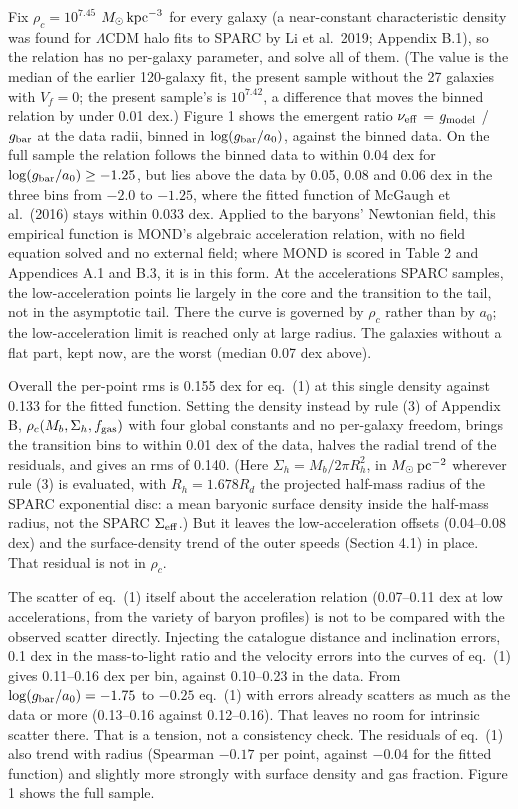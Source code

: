 \documentclass[
  10pt,
]{article}
\begin{document}
Fix $\rho_c=10^{7.45}$ $M_\odot\,{\rm kpc}^{-3}$ for every galaxy (a near-constant characteristic density was found for $\Lambda$CDM halo fits to SPARC by Li et al.~2019; Appendix B.1), so the relation has no per-galaxy parameter, and solve all of them. (The value is the median of the earlier 120-galaxy fit, the present sample without the 27 galaxies with $V_f=0$; the present sample's is $10^{7.42}$, a difference that moves the binned relation by under 0.01 dex.) Figure 1 shows the emergent ratio $\nu_{\rm eff}$ = $g_{\rm model}$ / $g_{\rm bar}$ at the data radii, binned in $\log(g_{\rm bar}/a_0)$, against the binned data. On the full sample the relation follows the binned data to within 0.04 dex for $\log(g_{\rm bar}/a_0)\ge-1.25$, but lies above the data by 0.05, 0.08 and 0.06 dex in the three bins from $-2.0$ to $-1.25$, where the fitted function of McGaugh et al.~(2016) stays within 0.033 dex. Applied to the baryons' Newtonian field, this empirical function is MOND's algebraic acceleration relation, with no field equation solved and no external field; where MOND is scored in Table 2 and Appendices A.1 and B.3, it is in this form. At the accelerations SPARC samples, the low-acceleration points lie largely in the core and the transition to the tail, not in the asymptotic tail. There the curve is governed by $\rho_c$ rather than by $a_0$; the low-acceleration limit is reached only at large radius. The galaxies without a flat part, kept now, are the worst (median 0.07 dex above).

Overall the per-point rms is 0.155 dex for eq.~(1) at this single density against 0.133 for the fitted function. Setting the density instead by rule (3) of Appendix B, $\rho_c(M_b,\Sigma_h,f_{\rm gas})$ with four global constants and no per-galaxy freedom, brings the transition bins to within 0.01 dex of the data, halves the radial trend of the residuals, and gives an rms of 0.140. (Here $\Sigma_h=M_b/2\pi R_h^2$, in $M_\odot\,{\rm pc}^{-2}$ wherever rule (3) is evaluated, with $R_h=1.678R_d$ the projected half-mass radius of the SPARC exponential disc: a mean baryonic surface density inside the half-mass radius, not the SPARC $\Sigma_{\rm eff}$.) But it leaves the low-acceleration offsets (0.04--0.08 dex) and the surface-density trend of the outer speeds (Section 4.1) in place. That residual is not in $\rho_c$.

The scatter of eq.~(1) itself about the acceleration relation (0.07--0.11 dex at low accelerations, from the variety of baryon profiles) is not to be compared with the observed scatter directly. Injecting the catalogue distance and inclination errors, 0.1 dex in the mass-to-light ratio and the velocity errors into the curves of eq.~(1) gives 0.11--0.16 dex per bin, against 0.10--0.23 in the data. From $\log(g_{\rm bar}/a_0)=-1.75$ to $-0.25$ eq.~(1) with errors already scatters as much as the data or more (0.13--0.16 against 0.12--0.16). That leaves no room for intrinsic scatter there. That is a tension, not a consistency check. The residuals of eq.~(1) also trend with radius (Spearman $-0.17$ per point, against $-0.04$ for the fitted function) and slightly more strongly with surface density and gas fraction. Figure 1 shows the full sample.
\end{document}
